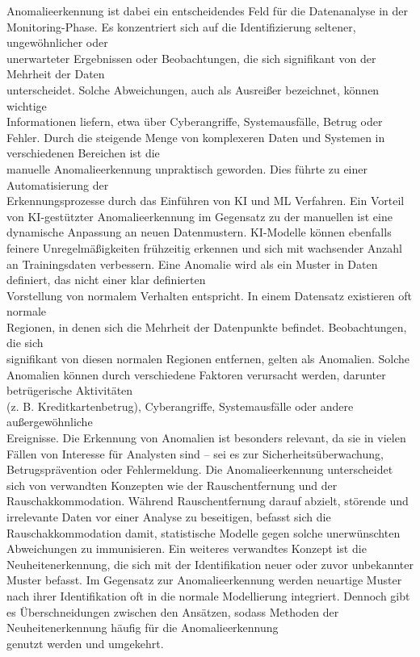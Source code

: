 \nAbsatz
Anomalieerkennung ist dabei ein entscheidendes Feld für die Datenanalyse in der \\ Monitoring-Phase. Es konzentriert sich auf die Identifizierung seltener, ungewöhnlicher oder \\ unerwarteter Ergebnissen oder Beobachtungen, die sich signifikant von der Mehrheit der Daten \\ unterscheidet. Solche Abweichungen, auch als Ausreißer bezeichnet, können wichtige \\ Informationen liefern, etwa über Cyberangriffe, Systemausfälle, Betrug oder Fehler. Durch die steigende Menge von komplexeren Daten und Systemen in verschiedenen Bereichen ist die \\ manuelle Anomalieerkennung unpraktisch geworden. Dies führte zu einer Automatisierung der \\ Erkennungsprozesse durch das Einführen von KI und ML Verfahren. Ein Vorteil von KI-gestützter Anomalieerkennung im Gegensatz zu der manuellen ist eine dynamische Anpassung an neuen Datenmustern. KI-Modelle können ebenfalls feinere Unregelmäßigkeiten frühzeitig erkennen und sich mit wachsender Anzahl an Trainingsdaten verbessern\cite{LOF}. \nAbsatz
Eine Anomalie wird als ein Muster in Daten definiert, das nicht einer klar definierten \\ Vorstellung von normalem Verhalten entspricht. In einem Datensatz existieren oft normale \\ Regionen, in denen sich die Mehrheit der Datenpunkte befindet. Beobachtungen, die sich \\ signifikant von diesen normalen Regionen entfernen, gelten als Anomalien.
Solche Anomalien können durch verschiedene Faktoren verursacht werden, darunter betrügerische Aktivitäten \\ (z. B. Kreditkartenbetrug), Cyberangriffe, Systemausfälle oder andere außergewöhnliche \\ Ereignisse. \newpage Die Erkennung von Anomalien ist besonders relevant, da sie in vielen Fällen von Interesse für Analysten sind – sei es zur Sicherheitsüberwachung, Betrugsprävention oder Fehlermeldung.
Die Anomalieerkennung unterscheidet sich von verwandten Konzepten wie der Rauschentfernung und der Rauschakkommodation. Während Rauschentfernung darauf abzielt, störende und irrelevante Daten vor einer Analyse zu beseitigen, befasst sich die Rauschakkommodation damit, statistische Modelle gegen solche unerwünschten Abweichungen zu immunisieren.
Ein weiteres verwandtes Konzept ist die Neuheitenerkennung, die sich mit der Identifikation neuer oder zuvor unbekannter Muster befasst. Im Gegensatz zur Anomalieerkennung werden neuartige Muster nach ihrer Identifikation oft in die normale Modellierung integriert. Dennoch gibt es Überschneidungen zwischen den Ansätzen, sodass Methoden der Neuheitenerkennung häufig für die Anomalieerkennung \\ genutzt werden und umgekehrt\cite{LOF}.
